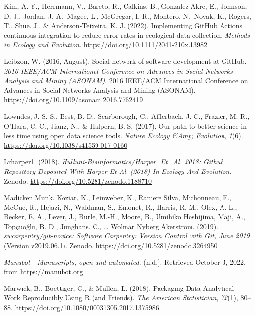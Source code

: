 \begin{CSLReferences}{1}{0}
\leavevmode{}%
Kim, A. Y., Herrmann, V., Bareto, R., Calkins, B., Gonzalez‐Akre, E., Johnson, D. J., Jordan, J. A., Magee, L., McGregor, I. R., Montero, N., Novak, K., Rogers, T., Shue, J., \& Anderson‐Teixeira, K. J. (2022). Implementing GitHub Actions continuous integration to reduce error rates in ecological data collection. \emph{Methods in Ecology and Evolution}. \url{https://doi.org/10.1111/2041-210x.13982}

\leavevmode{}%
Leibzon, W. (2016, August). Social network of software development at GitHub. \emph{2016 IEEE/ACM International Conference on Advances in Social Networks Analysis and Mining (ASONAM)}. 2016 IEEE/ACM International Conference on Advances in Social Networks Analysis and Mining (ASONAM). \url{https://doi.org/10.1109/asonam.2016.7752419}

\leavevmode{}%
Lowndes, J. S. S., Best, B. D., Scarborough, C., Afflerbach, J. C., Frazier, M. R., O'Hara, C. C., Jiang, N., \& Halpern, B. S. (2017). Our path to better science in less time using open data science tools. \emph{Nature Ecology \&Amp; Evolution}, \emph{1}(6). \url{https://doi.org/10.1038/s41559-017-0160}

\leavevmode{}%
Lrharper1. (2018). \emph{Hulluni-Bioinformatics/Harper\_Et\_Al\_2018: Github Repository Deposited With Harper Et Al. (2018) In Ecology And Evolution.} Zenodo. \url{https://doi.org/10.5281/zenodo.1188710}

\leavevmode{}%
Madicken Munk, Koziar, K., Leinweber, K., Raniere Silva, Michonneau, F., McCue, R., Hejazi, N., Waldman, S., Emonet, R., Harris, R. M., Olex, A. L., Becker, E. A., Lever, J., Burle, M.-H., Moore, B., Umihiko Hoshijima, Maji, A., Topçuoğlu, B. D., Junghans, C., \ldots{} Wolmar Nyberg Åkerström. (2019). \emph{swcarpentry/git-novice: Software Carpentry: Version Control with Git, June 2019} (Version v2019.06.1). Zenodo. \url{https://doi.org/10.5281/zenodo.3264950}

\leavevmode{}%
\emph{Manubot - Manuscripts, open and automated}. (n.d.). Retrieved October 3, 2022, from \url{https://manubot.org}

\leavevmode{}%
Marwick, B., Boettiger, C., \& Mullen, L. (2018). Packaging Data Analytical Work Reproducibly Using R (and Friends). \emph{The American Statistician}, \emph{72}(1), 80--88. \url{https://doi.org/10.1080/00031305.2017.1375986}


\end{CSLReferences}
